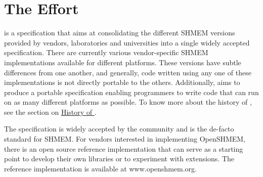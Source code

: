 
\section{The \openshmem{} Effort}

\openshmem{} is a specification that aims at consolidating the different
SHMEM versions provided by vendors, laboratories and universities 
into a single widely accepted specification. There are currently various vendor-specific SHMEM implementations available for
different platforms. These versions have subtle differences from one
another, and generally, code written using any one of these
implementations is not directly portable to the others. Additionally, \openshmem{} aims
to produce a portable specification enabling programmers to write
\openshmem{} code that can run on as many different platforms
as possible. To know more about the history of \openshmem{}, see the section on \hyperref[sec:openshmem_history]{History of \openshmem{}}.

The \openshmem{} specification is widely accepted by the community and is the de-facto
standard for SHMEM.  For vendors interested in implementing OpenSHMEM, there is an open source reference implementation
that can serve as a starting point to develop their own libraries or to experiment with extensions. The reference implementation is available at www.openshmem.org.
